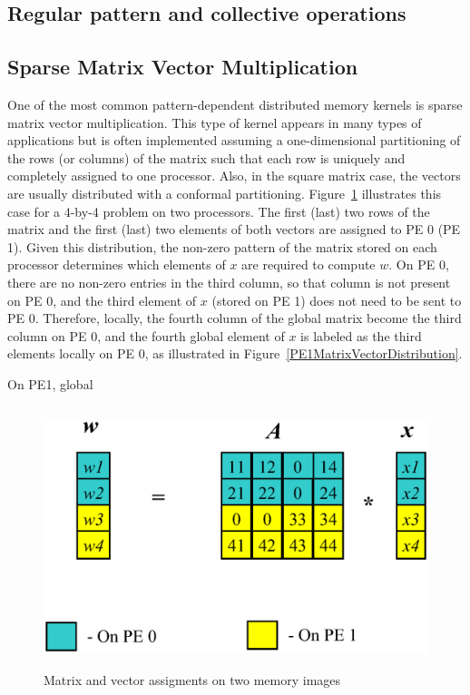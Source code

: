\documentclass[12pt,relax]{PetraObjectModel}
\begin{document}
\subsection{Regular pattern and collective operations}

\subsection{Sparse Matrix Vector Multiplication}

One of the most common pattern-dependent distributed memory 
kernels is sparse matrix vector multiplication.
This type of kernel appears in many types of applications but 
is often implemented assuming a
one-dimensional partitioning of the rows (or columns) of the 
matrix such that each row is uniquely and
completely assigned to one processor.  Also, in the square 
matrix case, the vectors are usually distributed
with a conformal partitioning.  Figure~\ref{MatrixVectorDistribution} 
illustrates this case for a 4-by-4
problem on two processors.  The first (last) two rows of 
the matrix and the first (last) two elements of 
both vectors are assigned to PE 0 (PE 1).  Given this 
distribution, the non-zero pattern of the matrix stored
on each processor determines which elements of $x$ are 
required to compute $w$.  On PE 0, there are no
non-zero entries in the third column, so that column is 
not present on PE 0, and the third element of $x$
(stored on PE 1) does not need to be sent to PE 0.  
Therefore, locally, the fourth
column of the global matrix become the third column on 
PE 0, and the fourth global element of $x$ is labeled
as the third elements locally on PE 0, as illustrated 
in Figure~\ref{PE1MatrixVectorDistribution}.

On PE1, global

\begin{figure} 
\begin{center} 
\includegraphics[height=3in]{TwoPESpMV}
\end{center} 
\label{MatrixVectorDistribution}
\caption{Matrix and vector assigments on two memory images}
\end{figure} 
\end{document}
